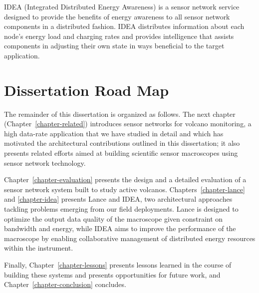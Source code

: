 \begin{itemize}
IDEA (Integrated Distributed Energy Awareness) is a sensor network service
designed to provide the benefits of energy awareness to all sensor network
components in a distributed fashion. IDEA distributes information about each
node's energy load and charging rates and provides intelligence that assists
components in adjusting their own state in ways beneficial to the target
application.

\end{itemize}

\section{Dissertation Road Map}

The remainder of this dissertation is organized as follows. The next chapter
(Chapter~\ref{chapter-related}) introduces sensor networks for volcano
monitoring, a high data-rate application that we have studied in detail and
which has motivated the architectural contributions outlined in this
dissertation; it also presents related efforts aimed at building scientific
sensor macroscopes using sensor network technology.

Chapter~\ref{chapter-evaluation} presents the design and a detailed
evaluation of a sensor network system built to study active volcanos.
Chapters~\ref{chapter-lance} and \ref{chapter-idea} presents Lance and IDEA,
two architectural approaches tackling problems emerging from our field
deployments. Lance is designed to optimize the output data quality of the
macroscope given constraint on bandwidth and energy, while IDEA aims to
improve the performance of the macroscope by enabling collaborative
management of distributed energy resources within the instrument.

Finally, Chapter~\ref{chapter-lessons} presents lessons learned in the course
of building these systems and presents opportunities for future work, and
Chapter~\ref{chapter-conclusion} concludes.

